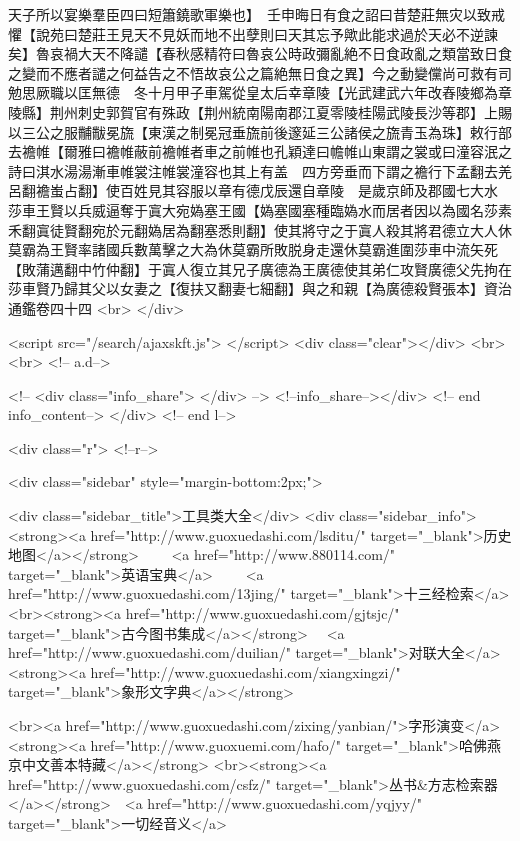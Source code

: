 天子所以宴樂羣臣四曰短簫鐃歌軍樂也】　壬申晦日有食之詔曰昔楚莊無灾以致戒懼【說苑曰楚莊王見天不見妖而地不出孽則曰天其忘予歟此能求過於天必不逆諫矣】魯哀禍大天不降譴【春秋感精符曰魯哀公時政彌亂絶不日食政亂之類當致日食之變而不應者譴之何益告之不悟故哀公之篇絶無日食之異】今之動變儻尚可救有司勉思厥職以匡無德　冬十月甲子車駕從皇太后幸章陵【光武建武六年改舂陵鄉為章陵縣】荆州刺史郭賀官有殊政【荆州統南陽南郡江夏零陵桂陽武陵長沙等郡】上賜以三公之服黼黻冕旒【東漢之制冕冠垂旒前後邃延三公諸侯之旒青玉為珠】敕行部去襜帷【爾雅曰襜帷蔽前襜帷者車之前帷也孔穎達曰幨帷山東謂之裳或曰潼容泯之詩曰淇水湯湯漸車帷裳注帷裳潼容也其上有盖　四方旁垂而下謂之襜行下孟翻去羌呂翻襜蚩占翻】使百姓見其容服以章有德戊辰還自章陵　是歲京師及郡國七大水　莎車王賢以兵威逼奪于寘大宛媯塞王國【媯塞國塞種臨媯水而居者因以為國名莎素禾翻寘徒賢翻宛於元翻媯居為翻塞悉則翻】使其將守之于寘人殺其將君德立大人休莫霸為王賢率諸國兵數萬擊之大為休莫霸所敗脱身走還休莫霸進圍莎車中流矢死【敗蒲邁翻中竹仲翻】于寘人復立其兄子廣德為王廣德使其弟仁攻賢廣德父先拘在莎車賢乃歸其父以女妻之【復扶又翻妻七細翻】與之和親【為廣德殺賢張本】資治通鑑卷四十四  <br>
   </div> 

<script src="/search/ajaxskft.js"> </script>
 <div class="clear"></div>
<br>
<br>
 <!-- a.d-->

 <!--
<div class="info_share">
</div> 
-->
 <!--info_share--></div>   <!-- end info_content-->
  </div> <!-- end l-->

<div class="r">   <!--r-->



<div class="sidebar"  style="margin-bottom:2px;">

 
<div class="sidebar_title">工具类大全</div>
<div class="sidebar_info">
<strong><a href="http://www.guoxuedashi.com/lsditu/" target="_blank">历史地图</a></strong>　　
<a href="http://www.880114.com/" target="_blank">英语宝典</a>　　
<a href="http://www.guoxuedashi.com/13jing/" target="_blank">十三经检索</a>　
<br><strong><a href="http://www.guoxuedashi.com/gjtsjc/" target="_blank">古今图书集成</a></strong>　
<a href="http://www.guoxuedashi.com/duilian/" target="_blank">对联大全</a>　<strong><a href="http://www.guoxuedashi.com/xiangxingzi/" target="_blank">象形文字典</a></strong>　

<br><a href="http://www.guoxuedashi.com/zixing/yanbian/">字形演变</a>　　<strong><a href="http://www.guoxuemi.com/hafo/" target="_blank">哈佛燕京中文善本特藏</a></strong>
<br><strong><a href="http://www.guoxuedashi.com/csfz/" target="_blank">丛书&方志检索器</a></strong>　<a href="http://www.guoxuedashi.com/yqjyy/" target="_blank">一切经音义</a>　　

